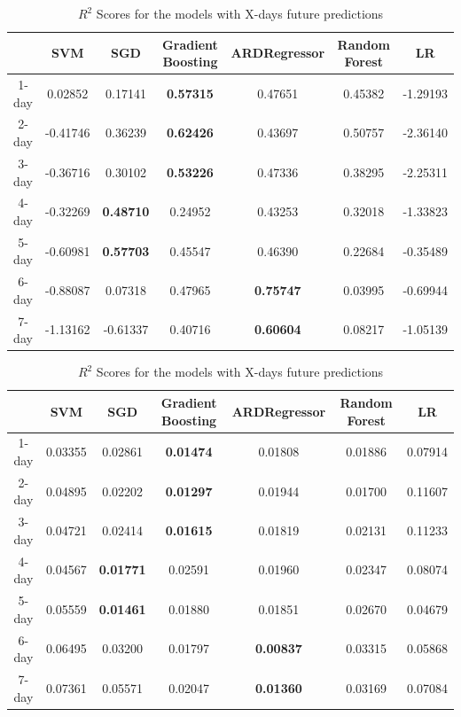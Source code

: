\documentclass[12pt,a4paper]{article}
\begin{document}
\begin{table}[htb]
    \begin{tabular}{ |c|c|c|c|c|c|c| }
        \hline
         & SVM & SGD & Gradient Boosting & ARDRegressor & Random Forest & LR \\
        \hline
        1-day & 0.02852 & 0.17141 & \textbf{0.57315} & 0.47651 & 0.45382 & -1.29193 \\
        \hline
        2-day & -0.41746 & 0.36239 & \textbf{0.62426} & 0.43697 & 0.50757 & -2.36140 \\
        \hline
        3-day & -0.36716 & 0.30102 & \textbf{0.53226} & 0.47336 & 0.38295 & -2.25311 \\
        \hline
        4-day & -0.32269 & \textbf{0.48710} & 0.24952 & 0.43253 & 0.32018 & -1.33823 \\
        \hline
        5-day & -0.60981 & \textbf{0.57703} & 0.45547 & 0.46390 & 0.22684 & -0.35489 \\
        \hline
        6-day & -0.88087 & 0.07318 & 0.47965 & \textbf{0.75747} & 0.03995 & -0.69944 \\
        \hline
        7-day & -1.13162 & -0.61337 & 0.40716 & \textbf{0.60604} & 0.08217 & -1.05139 \\
        \hline 
        \end{tabular}
        \caption{ $R^2$ Scores for the models with X-days future predictions}
    \begin{tabular}{ |c|c|c|c|c|c|c| }
        \hline
        & SVM & SGD & Gradient Boosting & ARDRegressor & Random Forest & LR \\
        \hline
        1-day & 0.03355 & 0.02861 & \textbf{0.01474} & 0.01808 & 0.01886 &  0.07914 \\
        \hline
        2-day & 0.04895 & 0.02202 & \textbf{0.01297} & 0.01944 & 0.01700 & 0.11607 \\
        \hline
        3-day & 0.04721 & 0.02414 & \textbf{0.01615} & 0.01819 & 0.02131 & 0.11233  \\
        \hline
        4-day & 0.04567 & \textbf{0.01771} & 0.02591 & 0.01960 & 0.02347 & 0.08074 \\
        \hline
        5-day & 0.05559 & \textbf{0.01461} & 0.01880 & 0.01851 & 0.02670 & 0.04679 \\
        \hline
        6-day & 0.06495 & 0.03200 & 0.01797 & \textbf{0.00837} & 0.03315 & 0.05868 \\
        \hline
        7-day & 0.07361 & 0.05571 & 0.02047 & \textbf{0.01360} & 0.03169 & 0.07084 \\

\end{tabular}
\end{table}
\end{document}
